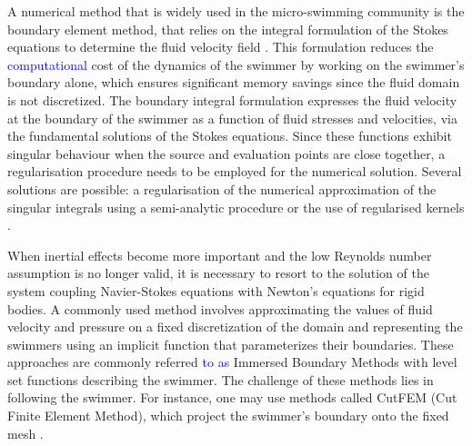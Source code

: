 \documentclass[graybox]{svmult}
\newcommand{\review}[1]{\textcolor{blue}{#1}}
\begin{document}
A numerical method that is widely used in the micro-swimming community is the boundary element method, that relies on the integral formulation of the Stokes equations to determine the fluid velocity field \cite{pozrikidis1992boundary}. 
This formulation reduces the \review{computational} cost of the dynamics of the swimmer by working on the swimmer's boundary alone, which ensures significant memory savings since the fluid domain is not discretized. 
The boundary integral formulation expresses the fluid velocity at the boundary of the swimmer as a function of fluid stresses and velocities, via the fundamental solutions of the Stokes equations. Since these functions exhibit singular behaviour when the source and evaluation points are close together, a regularisation procedure needs to be employed for the numerical solution. Several solutions are possible: a regularisation of the numerical approximation of the singular integrals using a semi-analytic procedure \cite{huang_cruse} or the use of regularised kernels \cite{Fauci}. 




When inertial effects become more important and the low Reynolds number assumption is no longer valid, 
it is necessary to resort to the solution of the system coupling Navier-Stokes equations with Newton's equations for rigid bodies. 
A commonly used method involves approximating the values of fluid velocity and pressure on a fixed discretization of the domain and representing the swimmers using an implicit function that parameterizes their boundaries. 
These approaches are commonly referred \review{to as} Immersed Boundary Methods with level set functions describing the swimmer. 
The challenge of these methods lies in following the swimmer. 
For instance, one may use methods called CutFEM (Cut Finite Element Method), which project the swimmer's boundary onto the fixed mesh \cite{Monasse,Iollo,bergmann2016bioinspired,hansbo2016cut,burman2015cutfem}.





\end{document}
